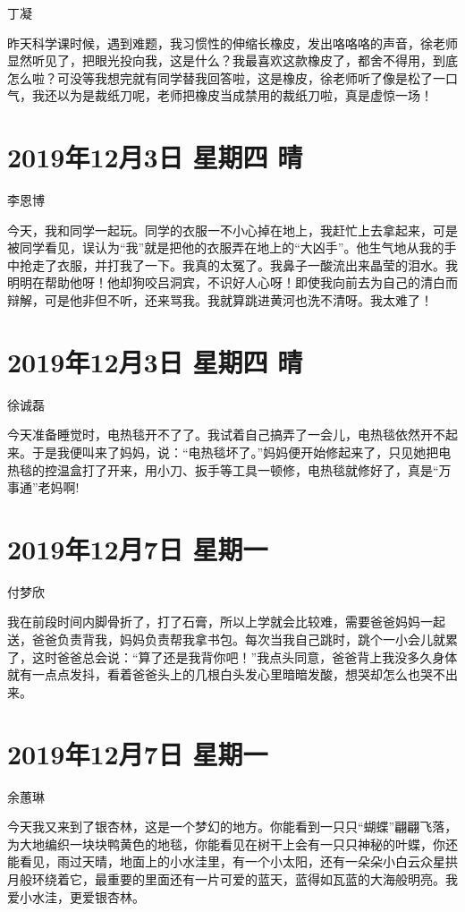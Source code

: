 丁凝

昨天科学课时候，遇到难题，我习惯性的伸缩长橡皮，发出咯咯咯的声音，徐老师显然听见了，把眼光投向我，这是什么？我最喜欢这款橡皮了，都舍不得用，到底怎么啦？可没等我想完就有同学替我回答啦，这是橡皮，徐老师听了像是松了一口气，我还以为是裁纸刀呢，老师把橡皮当成禁用的裁纸刀啦，真是虚惊一场！

\section{2019年12月3日 星期四 晴}

李恩博

今天，我和同学一起玩。同学的衣服一不小心掉在地上，我赶忙上去拿起来，可是被同学看见，误认为``我''就是把他的衣服弄在地上的``大凶手''。他生气地从我的手中抢走了衣服，并打我了一下。我真的太冤了。我鼻子一酸流出来晶莹的泪水。我明明在帮助他呀！他却狗咬吕洞宾，不识好人心呀！即使我向前去为自己的清白而辩解，可是他非但不听，还来骂我。我就算跳进黄河也洗不清呀。我太难了！

\section{2019年12月3日 星期四 晴}

徐诚磊

今天准备睡觉时，电热毯开不了了。我试着自己搞弄了一会儿，电热毯依然开不起来。于是我便叫来了妈妈，说：``电热毯坏了。''妈妈便开始修起来了，只见她把电热毯的控温盒打了开来，用小刀、扳手等工具一顿修，电热毯就修好了，真是``万事通''老妈啊!

\section{2019年12月7日 星期一}

付梦欣

我在前段时间内脚骨折了，打了石膏，所以上学就会比较难，需要爸爸妈妈一起送，爸爸负责背我，妈妈负责帮我拿书包。每次当我自己跳时，跳个一小会儿就累了，这时爸爸总会说：``算了还是我背你吧！''我点头同意，爸爸背上我没多久身体就有一点点发抖，看着爸爸头上的几根白头发心里暗暗发酸，想哭却怎么也哭不出来。

\section{2019年12月7日 星期一}

余蕙琳

今天我又来到了银杏林，这是一个梦幻的地方。你能看到一只只``蝴蝶''翩翩飞落，为大地编织一块块鸭黄色的地毯，你能看见在树干上会有一只只神秘的叶蝶，你还能看见，雨过天晴，地面上的小水洼里，有一个小太阳，还有一朵朵小白云众星拱月般环绕着它，最重要的里面还有一片可爱的蓝天，蓝得如瓦蓝的大海般明亮。我爱小水洼，更爱银杏林。

